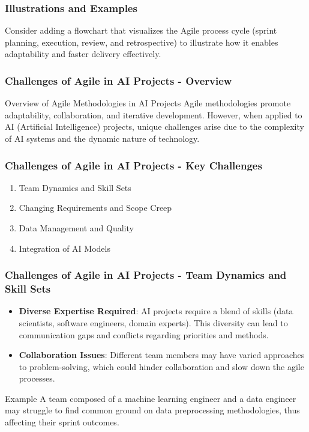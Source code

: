 \documentclass{beamer}
\begin{document}
\begin{frame}[fragile]
    \frametitle{Illustrations and Examples}
    Consider adding a flowchart that visualizes the Agile process cycle (sprint planning, execution, review, and retrospective) to illustrate how it enables adaptability and faster delivery effectively.
\end{frame}

\begin{frame}[fragile]
    \frametitle{Challenges of Agile in AI Projects - Overview}
    \begin{block}{Overview of Agile Methodologies in AI Projects}
        Agile methodologies promote adaptability, collaboration, and iterative development. However, when applied to AI (Artificial Intelligence) projects, unique challenges arise due to the complexity of AI systems and the dynamic nature of technology.
    \end{block}
\end{frame}

\begin{frame}[fragile]
    \frametitle{Challenges of Agile in AI Projects - Key Challenges}
    \begin{enumerate}
        \item Team Dynamics and Skill Sets
        \item Changing Requirements and Scope Creep
        \item Data Management and Quality
        \item Integration of AI Models
    \end{enumerate}
\end{frame}

\begin{frame}[fragile]
    \frametitle{Challenges of Agile in AI Projects - Team Dynamics and Skill Sets}
    \begin{itemize}
        \item \textbf{Diverse Expertise Required}: AI projects require a blend of skills (data scientists, software engineers, domain experts). This diversity can lead to communication gaps and conflicts regarding priorities and methods.
        \item \textbf{Collaboration Issues}: Different team members may have varied approaches to problem-solving, which could hinder collaboration and slow down the agile processes.
    \end{itemize}
    \begin{block}{Example}
        A team composed of a machine learning engineer and a data engineer may struggle to find common ground on data preprocessing methodologies, thus affecting their sprint outcomes.
    \end{block}
\end{frame}
\end{document}
